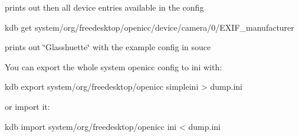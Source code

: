 prints out then all device entries available in the config \begin{DoxyVerb}    kdb get system/org/freedesktop/openicc/device/camera/0/EXIF_manufacturer
\end{DoxyVerb}


prints out \char`\"{}\+Glasshuette\char`\"{} with the example config in souce

You can export the whole system openicc config to ini with\+: \begin{DoxyVerb}    kdb export system/org/freedesktop/openicc simpleini > dump.ini
\end{DoxyVerb}


or import it\+: \begin{DoxyVerb}    kdb import system/org/freedesktop/openicc ini < dump.ini\end{DoxyVerb}
 
